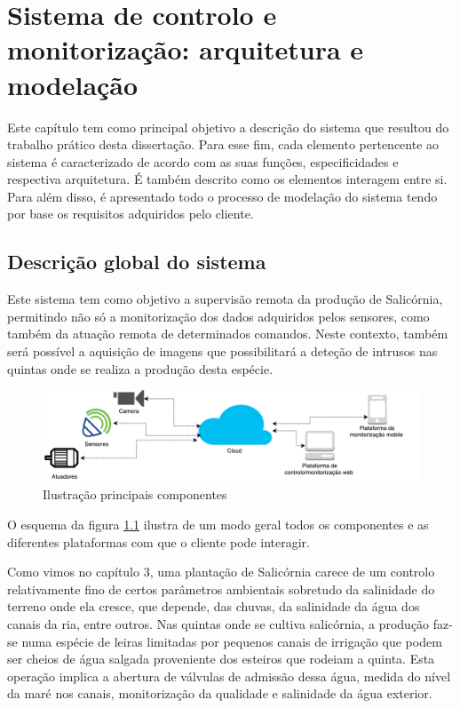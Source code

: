 

\chapter{Sistema de controlo e monitorização: arquitetura e modelação}


Este capítulo tem como principal objetivo a descrição do sistema que resultou do trabalho prático
desta dissertação. Para esse fim, cada elemento pertencente ao sistema é caracterizado de
acordo com as suas funções, especificidades e respectiva arquitetura. É também descrito como os elementos interagem entre si. Para além disso, é apresentado todo o processo de modelação do sistema tendo por base os requisitos adquiridos pelo cliente. 








\section{Descrição global do sistema}

Este sistema tem como objetivo a supervisão remota da produção de Salicórnia, permitindo não só a monitorização dos dados adquiridos pelos sensores, como também da atuação remota de determinados comandos. Neste contexto, também será possível a aquisição de imagens que possibilitará a deteção de intrusos nas quintas onde se realiza a produção desta espécie.


\begin{figure}[!htb]
	\centering
	\includegraphics[scale=0.5]{esquemas/global_arquitetura.pdf}
	\caption{Ilustração principais componentes}
	\label{componentesall}
\end{figure}



O esquema da figura \ref{componentesall} ilustra de um modo geral todos os componentes e as diferentes plataformas com que o cliente pode interagir. 


Como vimos no capítulo 3, uma plantação de  Salicórnia carece de um controlo relativamente fino de certos parâmetros ambientais sobretudo da salinidade do terreno onde ela cresce, que depende, das chuvas, da salinidade da água dos canais da ria, entre outros. Nas quintas onde se cultiva salicórnia, a produção faz-se numa espécie de leiras limitadas por pequenos canais de irrigação que podem ser cheios de água salgada proveniente dos esteiros que rodeiam a quinta. Esta operação implica a abertura de válvulas de admissão dessa água, medida do nível da maré nos canais, monitorização da qualidade e salinidade da água exterior.



